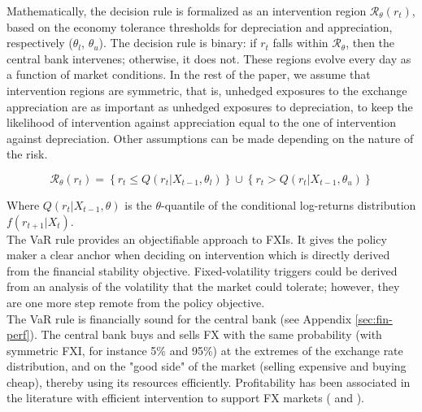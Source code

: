 \documentclass[11pt]{article}
\begin{document}
Mathematically,  the decision  rule is  formalized as  an intervention  region
$\mathcal{R}_\theta\left(r_t\right)$,   based   on   the   economy   tolerance
thresholds  for  depreciation   and  appreciation,  respectively  ($\theta_l$,
$\theta_u$).    The  decision   rule  is   binary:  if   $r_t$  falls   within
$\mathcal{R}_\theta$,  then the  central bank  intervenes; otherwise,  it does
not. These  regions evolve every day  as a function of  market conditions. In
the rest of the paper, we assume that intervention regions are symmetric, that
is,  unhedged exposures  to  the  exchange appreciation  are  as important  as
unhedged exposures  to depreciation,  to keep  the likelihood  of intervention
against   appreciation   equal   to    the   one   of   intervention   against
depreciation. Other  assumptions can be  made depending  on the nature  of the
risk.

\begin{equation*}
\mathcal{R}_\theta \left(r_t \right) = \left\{r_t \leq Q(r_t | X_{t-1},
    \theta_l) \right\} \cup \left\{r_t > Q(r_t | X_{t-1},
    \theta_u) \right\}
\end{equation*}

Where $Q(r_t |  X_{t-1}, \theta)$ is the $\theta$-quantile  of the conditional
log-returns distribution $f(r_{t+1}|X_t)$.\\

The VaR rule  provides an objectifiable approach to FXIs.  It gives the policy
maker a clear  anchor when deciding on intervention which  is directly derived
from  the financial  stability objective.  Fixed-volatility triggers  could be
derived from  an analysis of  the volatility  that the market  could tolerate;
however, they are one more step remote from the policy objective.\\

The  VaR  rule  is  financially  sound for  the  central  bank  (see  Appendix
\ref{sec:fin-perf}).   The  central bank  buys  and  sells  FX with  the  same
probability (with symmetric FXI, for instance 5\% and 95\%) at the extremes of
the exchange rate distribution, and on  the "good side" of the market (selling
expensive  and  buying  cheap),   thereby  using  its  resources  efficiently.
Profitability   has  been   associated  in   the  literature   with  efficient
intervention    to    support     FX    markets    (\cite{friedman1953}    and
\cite{sandri2020}).\\

\end{document}
